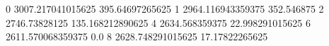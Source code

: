 0 3007.217041015625 395.64697265625
1 2964.116943359375 352.546875
2 2746.73828125 135.168212890625
4 2634.568359375 22.998291015625
6 2611.570068359375 0.0
8 2628.748291015625 17.17822265625
